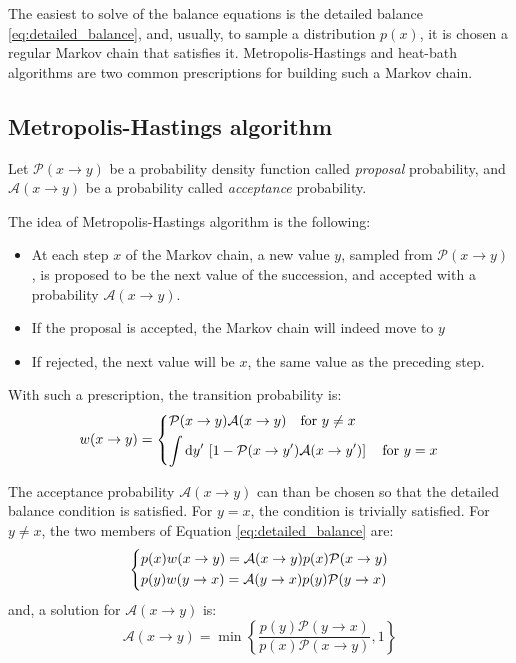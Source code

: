 The easiest to solve of the balance equations is the detailed balance \eqref{eq:detailed_balance},
and, usually, to sample a distribution $p(x)$, it is chosen a regular Markov chain that satisfies it.
Metropolis-Hastings and heat-bath algorithms are two common prescriptions for building such a Markov chain.

\subsection*{Metropolis-Hastings algorithm}
Let $\mathcal P(x\to y)$ be a probability density function called \emph{proposal} probability,
and $\mathcal A(x\to y)$ be a probability called \emph{acceptance} probability.

The idea of Metropolis-Hastings algorithm is the following:
\begin{itemize}
    \item At each step $x$ of the Markov chain, a new value $y$, sampled from $\mathcal P(x\to y)$,
        is proposed to be the next value of the succession, and accepted with a probability $\mathcal A(x\to y)$.
    \item If the proposal is accepted, the Markov chain will indeed move to $y$
    \item If rejected, the next value will be $x$, \ie the same value as the preceding step.
\end{itemize}

With such a prescription, the transition probability is:
\begin{equation}\label{eq:metropolis_transition}
    w(x\to y) = 
    \begin{dcases}
        \mathcal P(x\to y)\mathcal A(x\to y) \quad \mathrm{for}\ y \neq x \\
        \int\mathrm dy'\,\left[1 - \mathcal P(x\to y')\mathcal A(x\to y')\right] \quad \mathrm{for}\ y=x
    \end{dcases}
\end{equation}

The acceptance probability $\mathcal A(x\to y)$ can than be chosen so that the detailed balance condition is satisfied.
For $y=x$, the condition is trivially satisfied. 
For $y\neq x$, the two members of Equation \eqref{eq:detailed_balance} are:
\[
    \begin{dcases}
        p(x)w(x\to y) = \mathcal A(x\to y)p(x)\mathcal P(x\to y) \\
        p(y)w(y\to x) = \mathcal A(y\to x)p(y)\mathcal P(y\to x)
    \end{dcases}
\]
and, a solution for $\mathcal A(x\to y)$ is:
\begin{equation}\label{eq:acceptance}
    \mathcal A(x\to y) = \min\left\{\frac{p(y)\mathcal P(y\to x)}{p(x)\mathcal P(x\to y)},1\right\}
\end{equation}

